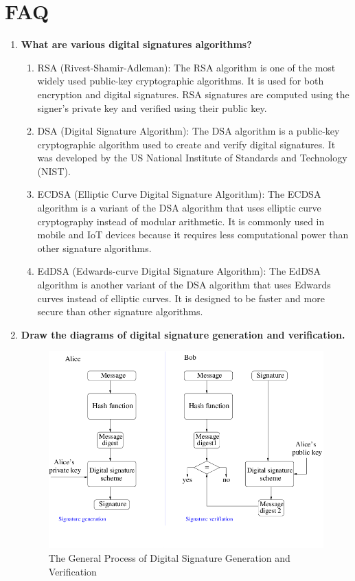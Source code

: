 \documentclass[11pt]{article}
\begin{document}
\section{FAQ}

\begin{enumerate}
    \item \textbf{What are various digital signatures algorithms?}\\
          \begin{enumerate}
              \item RSA (Rivest-Shamir-Adleman): The RSA algorithm is one of the most widely used public-key cryptographic algorithms. It is used for both encryption and digital signatures. RSA signatures are computed using the signer's private key and verified using their public key.

              \item DSA (Digital Signature Algorithm): The DSA algorithm is a public-key cryptographic algorithm used to create and verify digital signatures. It was developed by the US National Institute of Standards and Technology (NIST).

              \item ECDSA (Elliptic Curve Digital Signature Algorithm): The ECDSA algorithm is a variant of the DSA algorithm that uses elliptic curve cryptography instead of modular arithmetic. It is commonly used in mobile and IoT devices because it requires less computational power than other signature algorithms.

              \item EdDSA (Edwards-curve Digital Signature Algorithm): The EdDSA algorithm is another variant of the DSA algorithm that uses Edwards curves instead of elliptic curves. It is designed to be faster and more secure than other signature algorithms.
          \end{enumerate}

    \item \textbf{Draw the diagrams of digital signature generation and verification.}\\

          \begin{figure}[H]
              \centering
              \includegraphics[width=.80\textwidth]{./Digital-signature-generation-and-verification.png}
              \caption{The General Process of Digital Signature Generation and Verification}
          \end{figure}


\end{enumerate}
\end{document}
